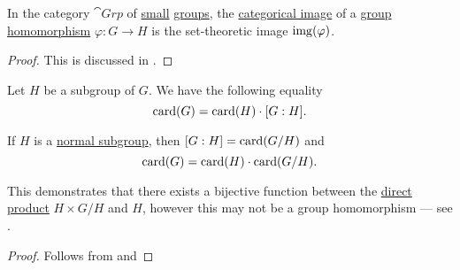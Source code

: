 \begin{proposition}\label{thm:cokernels_in_grp}
  In the category \hyperref[def:group/category]{\( \cat{Grp} \)} of \hyperref[def:category_size]{small} \hyperref[def:group]{groups}, the \hyperref[def:zero_morphisms/image]{categorical image} of a \hyperref[def:group/homomorphism]{group homomorphism} \( \varphi: G \to H \) is the set-theoretic image \( \operatorname{img}(\varphi) \).
\end{proposition}
\begin{proof}
  This is discussed in .
\end{proof}

\begin{theorem}\label{thm:lagranges_theorem_for_groups}
  Let \( H \) be a subgroup of \( G \). We have the following equality
  \begin{equation}\label{eq:thm:lagranges_theorem_for_groups/index}
    \operatorname{card}(G) = \operatorname{card}(H) \cdot [G : H].
  \end{equation}

  If \( H \) is a \hyperref[def:normal_subgroup]{normal subgroup}, then \( [G : H] = \operatorname{card}(G / H) \) and
  \begin{equation}\label{eq:thm:lagranges_theorem_for_groups/card}
    \operatorname{card}(G) = \operatorname{card}(H) \cdot \operatorname{card}(G / H).
  \end{equation}

  This demonstrates that there exists a bijective function between the \hyperref[def:group_direct_product]{direct product} \( H \times G / H \) and \( H \), however this may not be a group homomorphism --- see .
\end{theorem}
\begin{proof}
  Follows from  and 
\end{proof}

